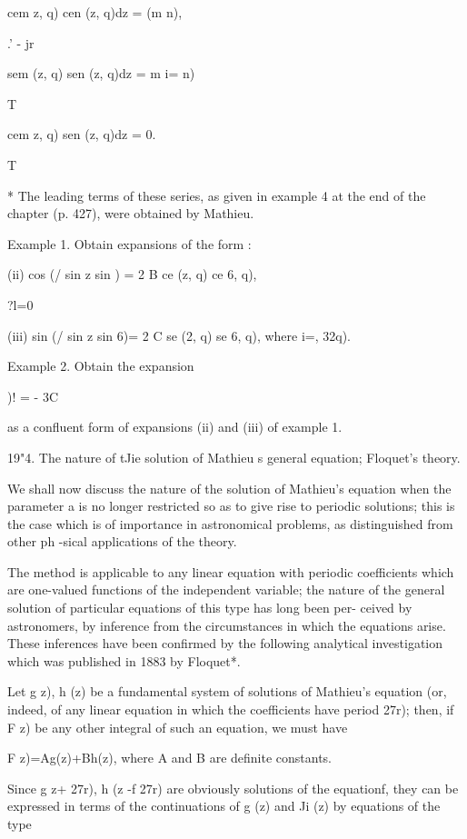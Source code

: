 cem z, q) cen (z, q)dz = (m n),

.' - jr

sem (z, q) sen (z, q)dz = m i= n)

T

cem z, q) sen (z, q)dz = 0.

T

* The leading terms of these series, as given in example 4 at the end
of the chapter (p. 427), were obtained by Mathieu.

%
%

Example 1. Obtain expansions of the form :

(ii) cos (/ sin z sin ) = 2 B ce (z, q) ce 6, q),

?l=0

(iii) sin (/ sin z sin 6)= 2 C se (2, q) se 6, q), where i=, 32q).

Example 2. Obtain the expansion

)! = - 3C

as a confluent form of expansions (ii) and (iii) of example 1.

19"4. The nature of tJie solution of Mathieu s general equation;
Floquet's theory.

We shall now discuss the nature of the solution of Mathieu's equation
when the parameter a is no longer restricted so as to give rise to
periodic solutions; this is the case which is of importance in
astronomical problems, as distinguished from other ph -sical
applications of the theory.

The method is applicable to any linear equation with periodic
coefficients which are one-valued functions of the independent
variable; the nature of the general solution of particular equations
of this type has long been per- ceived by astronomers, by inference
from the circumstances in which the equations arise. These inferences
have been confirmed by the following analytical investigation which
was published in 1883 by Floquet*.

Let g z), h (z) be a fundamental system of solutions of Mathieu's
equation (or, indeed, of any linear equation in which the coefficients
have period 27r); then, if F z) be any other integral of such an
equation, we must have

F z)=Ag(z)+Bh(z), where A and B are definite constants.

Since g z+ 27r), h (z -f 27r) are obviously solutions of the
equationf, they can be expressed in terms of the continuations of g
(z) and Ji (z) by equations of the type

